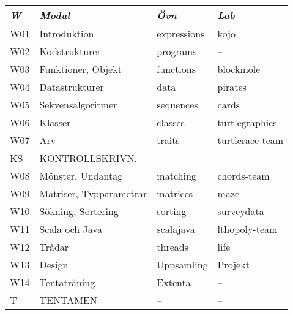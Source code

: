 \begin{tabular}{l|l|l|l}
\textit{W} & \textit{Modul} & \textit{Övn} & \textit{Lab} \\ \hline \hline
W01 & Introduktion            & expressions & kojo            \\
W02 & Kodstrukturer           & programs    & --              \\
W03 & Funktioner, Objekt      & functions   & blockmole       \\
W04 & Datastrukturer          & data        & pirates         \\
W05 & Sekvensalgoritmer       & sequences   & cards           \\
W06 & Klasser                 & classes     & turtlegraphics  \\
W07 & Arv                     & traits      & turtlerace-team \\
KS  & KONTROLLSKRIVN.         & --          & --              \\
W08 & Mönster, Undantag       & matching    & chords-team     \\
W09 & Matriser, Typparametrar & matrices    & maze            \\
W10 & Sökning, Sortering      & sorting     & surveydata      \\
W11 & Scala och Java          & scalajava   & lthopoly-team   \\
W12 & Trådar                  & threads     & life            \\
W13 & Design                  & Uppsamling  & Projekt         \\
W14 & Tentaträning            & Extenta     & --              \\
T   & TENTAMEN                & --          & --              \\
\end{tabular}
